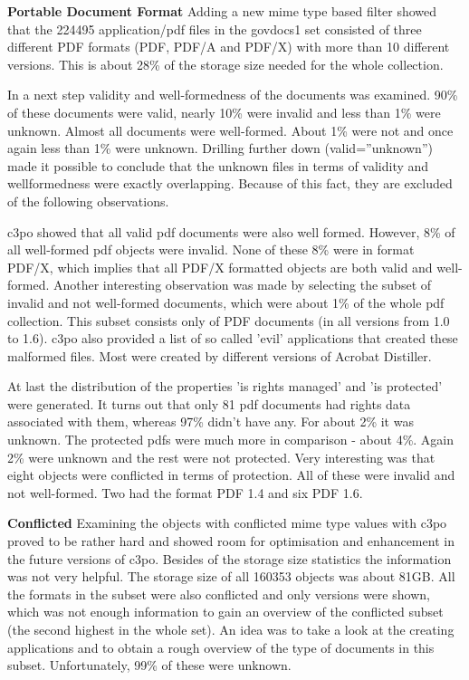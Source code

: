 \textbf{Portable Document Format}\newline
Adding a new mime type based filter showed that the 224495 application/pdf files in the govdocs1 set consisted of three different PDF formats (PDF, PDF/A and PDF/X) with more than 10 different versions. This is about 28\% of the storage size  needed for the whole collection.

In a next step validity and well-formedness of the documents was examined. 90\% of these documents were valid, nearly 10\% were invalid and less than 1\% were unknown. Almost all documents were well-formed. About 1\% were not and once again less than 1\% were unknown. Drilling further down (valid=''unknown'') made it possible to conclude that  the unknown files in terms of validity and wellformedness were exactly overlapping. Because of this fact, they are excluded of the following observations.

c3po showed that all valid pdf documents were also well formed. However, 8\% of all well-formed pdf objects were invalid. None of these 8\% were in format PDF/X, which implies that all PDF/X formatted objects are both valid and well-formed. Another interesting observation was made by selecting the subset of invalid and not well-formed documents, which were about 1\% of the whole pdf collection. This subset consists only of PDF documents (in all versions from 1.0 to 1.6). c3po also provided a list of so called 'evil' applications that created these malformed files. Most were created by different versions of Acrobat Distiller.

At last the distribution of the properties 'is rights managed' and 'is protected' were generated.
It turns out that only 81 pdf documents had rights data associated with them, whereas 97\% didn't have any. For about 2\% it was unknown. The protected pdfs were much more in comparison - about 4\%. Again 2\% were unknown and the rest were not protected. Very interesting was that eight objects were conflicted in terms of protection. All of these were invalid and not well-formed. Two had the format PDF 1.4 and six PDF 1.6.\newline

\textbf{Conflicted}\newline
Examining the objects with conflicted mime type values with c3po proved to be rather hard and showed room for optimisation and enhancement in the future versions of c3po. Besides of the storage size statistics the information was not very helpful. The storage size of all 160353 objects was about 81GB. All the formats in the subset were also conflicted and only versions were shown, which was not enough information to gain an overview of the conflicted subset (the second highest in the whole set). An idea was to take a look at the creating applications and to obtain a rough overview of the type of documents in this subset. Unfortunately, 99\% of these were unknown.

